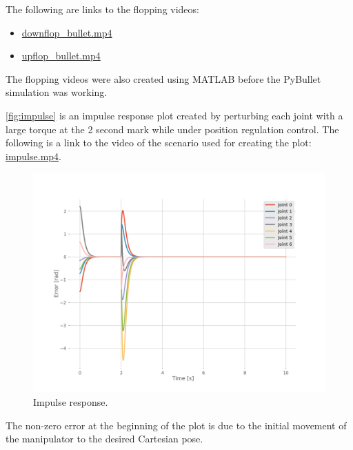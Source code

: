 \documentclass{article}
\begin{document}
The following are links to the flopping videos:
\begin{itemize}
  \item \href{./downflop_bullet.mp4}{downflop\_bullet.mp4}
  \item \href{./upflop_bullet.mp4}{upflop\_bullet.mp4}
\end{itemize}
The flopping videos were also created using MATLAB before the PyBullet simulation was working.

\autoref{fig:impulse} is an impulse response plot created by perturbing each joint with a large torque at the 2 second
mark while under position regulation control.
The following is a link to the video of the scenario used for creating the plot: \href{./impulse.mp4}{impulse.mp4}.
\begin{figure}[h]
  \centering
  \includegraphics[width=0.6\linewidth]{impulse}
  \caption{Impulse response.}
  \label{fig:impulse}
\end{figure}
The non-zero error at the beginning of the plot is due to the initial movement of the manipulator to the desired
Cartesian pose.
\end{document}
